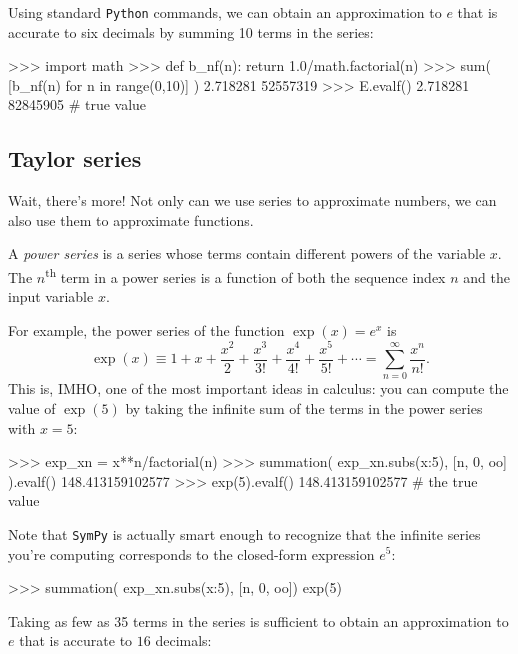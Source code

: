 Using standard \texttt{Python} commands,  
we can obtain an approximation to $e$ that is accurate to six decimals by summing 10 terms in the series: 

\small
\begin{verbatimtab}
>>> import math
>>> def b_nf(n): 
        return 1.0/math.factorial(n)
>>> sum( [b_nf(n) for n in range(0,10)] )
2.718281 52557319
>>> E.evalf()
2.718281 82845905       # true value
\end{verbatimtab}
\normalsize
\subsection{Taylor series}
\label{calculus:taylor_series}

Wait, there's more! 
Not only can we use series to approximate numbers,
we can also use them to approximate functions.

A \emph{power series} is a series whose terms contain different powers of the variable $x$.
The $n$\textsuperscript{th} term in a power series is a function of both the sequence index $n$ and the input variable $x$.

For example, the power series of the function $\exp(x)=e^x$ is 
\[
 \exp(x) \equiv  1 + x + \frac{x^2}{2} + \frac{x^3}{3!} + \frac{x^4}{4!} + \frac{x^5}{5!} + \cdots         
  =       \sum_{n=0}^\infty \frac{x^n}{n!}.
\]
This is, IMHO, one of the most important ideas in calculus:
you can compute the value of $\exp(5)$ by taking the infinite sum of the terms in the power series with $x=5$:



\small
\begin{verbatimtab}
>>> exp_xn = x**n/factorial(n)
>>> summation( exp_xn.subs({x:5}), [n, 0, oo] ).evalf()
148.413159102577
>>> exp(5).evalf()
148.413159102577        # the true value
\end{verbatimtab}
\normalsize

\noindent
Note that \texttt{SymPy} is actually smart enough to recognize that the infinite series
you're computing corresponds to the closed-form expression $e^5$:



\small
\begin{verbatimtab}
>>> summation( exp_xn.subs({x:5}), [n, 0, oo])
exp(5)
\end{verbatimtab}
\normalsize
Taking as few as 35 terms in the series is sufficient to obtain an approximation to $e$
that is accurate to $16$ decimals:

